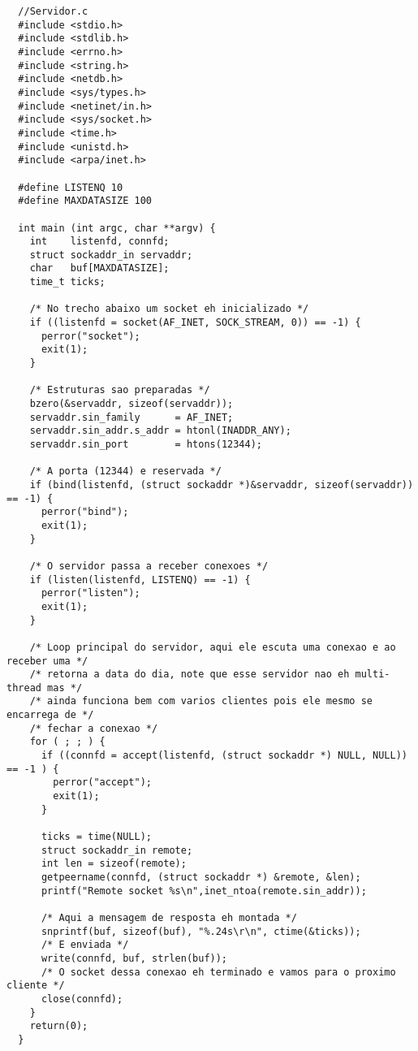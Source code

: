 \documentclass[11pt]{article}
\begin{document}
\begin{lstlisting}
  //Servidor.c
  #include <stdio.h>
  #include <stdlib.h>
  #include <errno.h>
  #include <string.h>
  #include <netdb.h>
  #include <sys/types.h>
  #include <netinet/in.h>
  #include <sys/socket.h>
  #include <time.h>
  #include <unistd.h>
  #include <arpa/inet.h>

  #define LISTENQ 10
  #define MAXDATASIZE 100

  int main (int argc, char **argv) {
    int    listenfd, connfd;
    struct sockaddr_in servaddr;
    char   buf[MAXDATASIZE];
    time_t ticks;

    /* No trecho abaixo um socket eh inicializado */
    if ((listenfd = socket(AF_INET, SOCK_STREAM, 0)) == -1) {
      perror("socket");
      exit(1);
    }

    /* Estruturas sao preparadas */
    bzero(&servaddr, sizeof(servaddr));
    servaddr.sin_family      = AF_INET;
    servaddr.sin_addr.s_addr = htonl(INADDR_ANY);
    servaddr.sin_port        = htons(12344);   

    /* A porta (12344) e reservada */
    if (bind(listenfd, (struct sockaddr *)&servaddr, sizeof(servaddr)) == -1) {
      perror("bind");
      exit(1);
    }

    /* O servidor passa a receber conexoes */
    if (listen(listenfd, LISTENQ) == -1) {
      perror("listen");
      exit(1);
    }

    /* Loop principal do servidor, aqui ele escuta uma conexao e ao receber uma */
    /* retorna a data do dia, note que esse servidor nao eh multi-thread mas */
    /* ainda funciona bem com varios clientes pois ele mesmo se encarrega de */
    /* fechar a conexao */
    for ( ; ; ) {
      if ((connfd = accept(listenfd, (struct sockaddr *) NULL, NULL)) == -1 ) {
        perror("accept");
        exit(1);
      }

      ticks = time(NULL);
      struct sockaddr_in remote;
      int len = sizeof(remote);
      getpeername(connfd, (struct sockaddr *) &remote, &len);
      printf("Remote socket %s\n",inet_ntoa(remote.sin_addr));

      /* Aqui a mensagem de resposta eh montada */
      snprintf(buf, sizeof(buf), "%.24s\r\n", ctime(&ticks));
      /* E enviada */
      write(connfd, buf, strlen(buf));
      /* O socket dessa conexao eh terminado e vamos para o proximo cliente */
      close(connfd);
    }
    return(0);
  }

\end{lstlisting}
\end{document}
